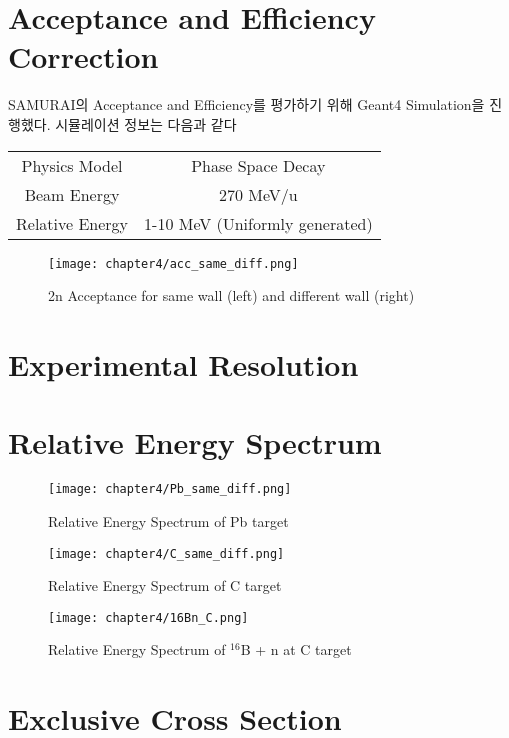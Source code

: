 \section{Acceptance and Efficiency Correction}
SAMURAI의 Acceptance and Efficiency를 평가하기 위해 Geant4 Simulation을 진행했다. 시뮬레이션 정보는 다음과 같다 
\begin{center}
    \begin{tabular}[h]{c|c}
        \hline
        Physics Model & Phase Space Decay \\
        
        Beam Energy & 270 MeV/u\\
        Relative Energy & 1-10 MeV (Uniformly generated)\\
        \hline
    \end{tabular}
\end{center}

\begin{figure}
    \centering
    \texttt{[image: chapter4/acc\_same\_diff.png]}
    \caption{2n Acceptance for same wall (left) and different wall (right)}
    \label{2n Acceptance for same wall (left) and different wall (right)}
\end{figure}




\section{Experimental Resolution}


\section{Relative Energy Spectrum}
\begin{figure}
    \centering
    \texttt{[image: chapter4/Pb\_same\_diff.png]}
    \caption{Relative Energy Spectrum of Pb target}
    \label{Relative Energy Spectrum of Pb target}
\end{figure}
\begin{figure}
    \centering
    \texttt{[image: chapter4/C\_same\_diff.png]}
    \caption{Relative Energy Spectrum of C target}
    \label{Relative Energy Spectrum of C target}
\end{figure}

\begin{figure}
    \centering
    \texttt{[image: chapter4/16Bn\_C.png]}
    \caption{Relative Energy Spectrum of ${}^{16}$B + n at C target}
    \label{Relative Energy Spectrum of ${}^{16}$B + n C target}
\end{figure}



\section{Exclusive Cross Section}   